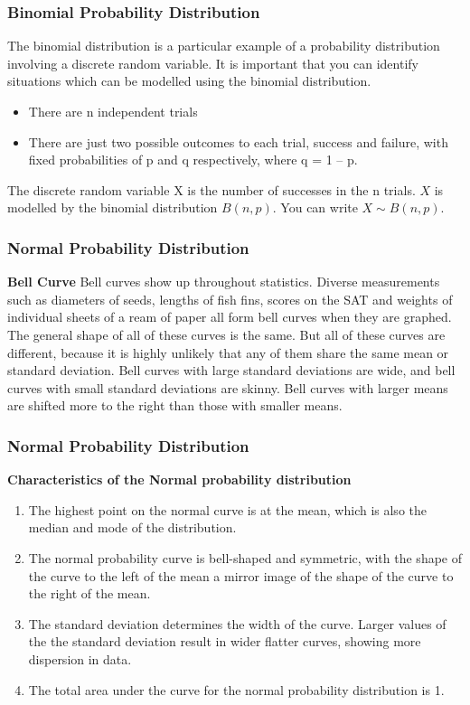 \documentclass[IntroMain.tex]{subfiles}
\begin{document}
\begin{frame}
	\frametitle{Binomial Probability Distribution}
The binomial distribution is a particular example of a probability distribution involving a discrete random variable. 
It is important that you can identify situations which can be modelled using the binomial distribution. 
\begin{itemize}
\item There are n independent trials 
\item There are just two possible outcomes to each trial, success and failure, with fixed probabilities of p and q respectively, where q = 1 – p. 
\end{itemize}

The discrete random variable X is the number of successes in the n trials. 
$X$ is modelled by the binomial distribution $B(n,p)$. You can write $X \sim B(n, p)$.
\end{frame}

\begin{frame}
	\frametitle{Normal Probability Distribution}

\textbf{Bell Curve}
Bell curves show up throughout statistics. Diverse measurements such as diameters of seeds, lengths of fish fins, scores on the SAT and weights of individual sheets of a ream of paper all form bell curves when they are graphed. The general shape of all of these curves is the same. But all of these curves are different, because it is highly unlikely that any of them share the same mean or standard deviation. Bell curves with large standard deviations are wide, and bell curves with small standard deviations are skinny. Bell curves with larger means are shifted more to the right than those with smaller means.

\end{frame}
\begin{frame}
	\frametitle{Normal Probability Distribution}
\textbf{Characteristics of the Normal probability distribution}

\begin{enumerate}
\item The highest point on the normal curve is at the mean, which is also the median and mode of the distribution.

\item The normal probability curve is bell-shaped and symmetric, with the shape of the curve to the left of the mean a mirror image of the shape of the curve to the right of the mean.

\item The standard deviation determines the width of the curve. Larger values of the the standard deviation result in wider flatter curves, showing more dispersion in data.

\item The total area under the curve for the normal probability distribution is 1.
\end{enumerate}

\end{frame}
\end{document}
